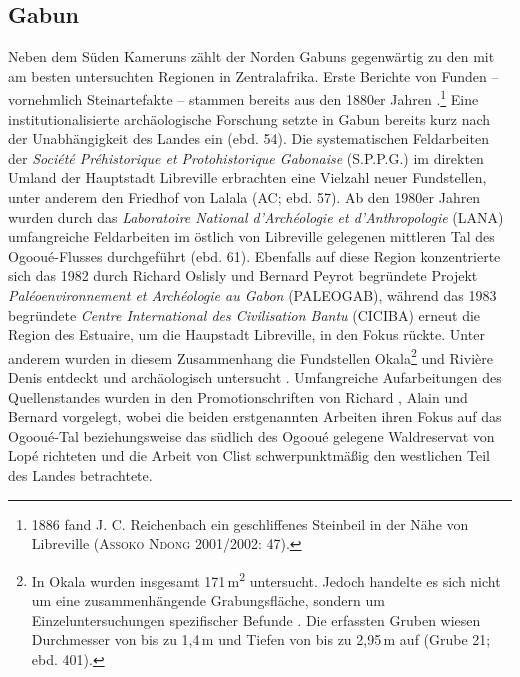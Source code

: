 \subsection{Gabun}\label{sec:Gabun}

Neben dem Süden Kameruns zählt der Norden Gabuns gegenwärtig zu den mit am besten untersuchten Regionen in Zentralafrika. Erste Berichte von Funden -- vornehmlich Steinartefakte -- stammen bereits aus den 1880er Jahren \parencite[47]{AssokoNdong.20002001}.\footnote{1886 fand J. C. Reichenbach ein geschliffenes Steinbeil in der Nähe von Libreville (\textsc{Assoko Ndong} 2001/2002: 47).} Eine institutionalisierte archäologische Forschung setzte in Gabun bereits kurz nach der Unabhängigkeit des Landes ein (ebd. 54). Die systematischen Feldarbeiten der \textit{Société Préhistorique et Protohistorique Gabonaise} (S.P.P.G.) im direkten Umland der Hauptstadt Libreville erbrachten eine Vielzahl neuer Fundstellen, unter anderem den Friedhof von Lalala (AC; ebd. 57). Ab den 1980er Jahren wurden durch das \textit{Laboratoire National d'Archéologie et d'Anthropologie} (LANA) umfangreiche Feldarbeiten im östlich von Libreville gelegenen mittleren Tal des Ogooué-Flusses durchgeführt (ebd. 61). Ebenfalls auf diese Region konzentrierte sich das 1982 durch Richard Oslisly und Bernard Peyrot begründete Projekt \textit{Paléoenvironnement et Archéologie au Gabon} (PALEOGAB), während das 1983 begründete \textit{Centre International des Civilisation Bantu} (CICIBA) erneut die Region des Estuaire, um die Haupstadt Libreville, in den Fokus rückte. Unter anderem wurden in diesem Zusammenhang die Fundstellen Okala\footnote{In Okala wurden insgesamt 171\,m\textsuperscript{2} untersucht. Jedoch handelte es sich nicht um eine zusammenhängende Grabungsfläche, sondern um Einzeluntersuchungen spezifischer Befunde \parencite[24 Tab.~1-1]{Clist.20042005}. Die erfassten Gruben wiesen Durchmesser von bis zu 1,4\,m und Tiefen von bis zu 2,95\,m auf (Grube 21; ebd. 401).} und Rivière Denis entdeckt und archäologisch untersucht \parencite[68]{AssokoNdong.20002001}. Umfangreiche Aufarbeitungen des Quellenstandes wurden in den Promotionschriften von Richard \textcite{Oslisly.1992}, Alain \textcite{AssokoNdong.20002001} und Bernard \textcite{Clist.20042005} vorgelegt, wobei die beiden erstgenannten Arbeiten ihren Fokus auf das Ogooué-Tal beziehungsweise das südlich des Ogooué gelegene Waldreservat von Lopé richteten und die Arbeit von Clist schwerpunktmäßig den westlichen Teil des Landes betrachtete.

